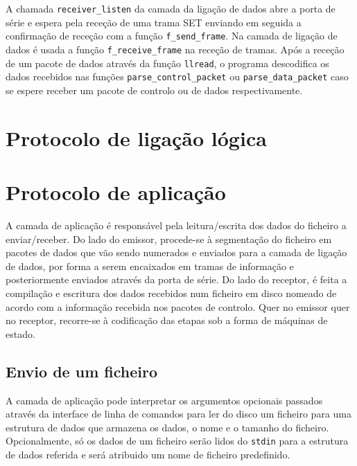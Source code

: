 \documentclass[a4paper,11pt,titlepage]{article}
\begin{document}
A chamada \texttt{receiver\_listen} da camada da ligação de dados abre a porta de série e espera pela receção de uma trama SET enviando em seguida a confirmação de receção com a função \texttt{f\_send\_frame}. Na camada de ligação de dados é usada a função \texttt{f\_receive\_frame} na receção de tramas. Após a receção de um pacote de dados através da função \texttt{llread}, o programa descodifica os dados recebidos nas funções \texttt{parse\_control\_packet} ou \texttt{parse\_data\_packet} caso se espere receber um pacote de controlo ou de dados respectivamente.

\section{Protocolo de ligação lógica}

\section{Protocolo de aplicação}

A camada de aplicação é responsável pela leitura/escrita dos dados do ficheiro a enviar/receber. Do lado do emissor, procede-se à segmentação do ficheiro em pacotes de dados que vão sendo numerados e enviados para a camada de ligação de dados, por forma a serem encaixados em tramas de informação e posteriormente enviados através da porta de série. Do lado do receptor, é feita a compilação e escritura dos dados recebidos num ficheiro em disco nomeado de acordo com a informação recebida nos pacotes de controlo. Quer no emissor quer no receptor, recorre-se à codificação das etapas sob a forma de máquinas de estado.

\subsection{Envio de um ficheiro}
A camada de aplicação pode interpretar os argumentos opcionais passados através da interface de linha de comandos para ler do disco um ficheiro para uma estrutura de dados que armazena os dados, o nome e o tamanho do ficheiro. Opcionalmente, só os dados de um ficheiro serão lidos do \texttt{stdin} para a estrutura de dados referida e será atribuido um nome de ficheiro predefinido.
\end{document}
